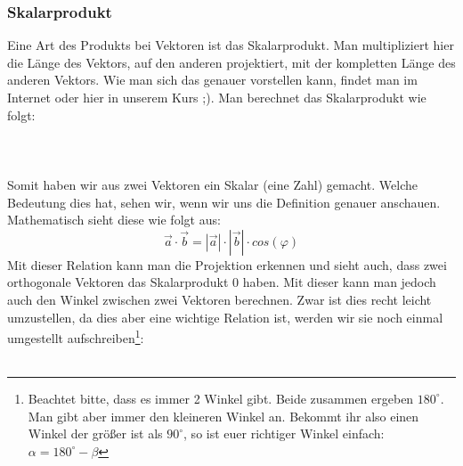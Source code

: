	\subsubsection{Skalarprodukt}
		Eine Art des Produkts bei Vektoren ist das Skalarprodukt. Man multipliziert
		hier die Länge des Vektors, auf den anderen projektiert, mit der kompletten
		Länge des anderen Vektors. Wie man sich das genauer vorstellen kann, findet
		man im Internet oder hier in unserem Kurs ;). Man berechnet das Skalarprodukt
		wie folgt:
		\\ \\
		\formel{\[\vec{a}\cdot \vec{b}=a_1\cdot b_1+a_2\cdot b_2+a_3\cdot b_3\]}
		\\ \\
		Somit haben wir aus zwei Vektoren ein Skalar (eine Zahl) gemacht. Welche
		Bedeutung dies hat, sehen wir, wenn wir uns die Definition genauer anschauen.
		Mathematisch sieht diese wie folgt aus:
		\[\vec{a}\cdot \vec{b}=|\vec{a}|\cdot |\vec{b}|\cdot cos(\varphi)\]
		Mit dieser Relation kann man die Projektion erkennen und sieht auch, dass zwei
		orthogonale Vektoren das Skalarprodukt 0 haben. Mit dieser kann man jedoch
		auch den Winkel zwischen zwei Vektoren berechnen. Zwar ist dies recht leicht
		umzustellen, da dies aber eine wichtige Relation ist, werden wir sie noch
		einmal umgestellt aufschreiben\footnote{Beachtet bitte, dass es immer 2 Winkel
		gibt. Beide zusammen ergeben \(180^{\circ}\). Man gibt aber immer den
		kleineren Winkel an. Bekommt ihr also einen Winkel der größer ist als
		\(90^{\circ}\), so ist euer richtiger Winkel einfach:
		\(\alpha=180^{\circ}-\beta\)}:
		\\ \\
		\formel{\[cos(\varphi)=\frac{ | \vec{a}\cdot \vec{b} | }{|\vec{a}|\cdot
		|\vec{b}|}\]}

